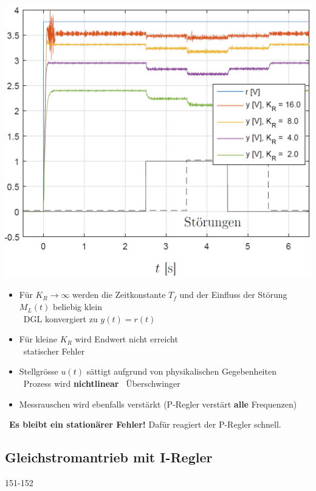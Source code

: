 \begin{minipage}[c]{0.4\columnwidth}
    \includegraphics[width=\columnwidth]{images/gleichstromantrieb_p-regler_step-response.png}
\end{minipage}
\hfill
\begin{minipage}[c]{0.58\columnwidth}
    \begin{itemize}
        \item Für $K_R \to \infty$ werden die Zeitkonstante $T_f$ und der Einfluss der Störung $M_L(t)$ beliebig klein \\
            \textrightarrow\ DGL konvergiert zu $y(t) = r(t)$
        \item Für kleine $K_R$ wird Endwert nicht erreicht \\
            \textrightarrow\ statischer Fehler
        \item Stellgrösse $u(t)$ sättigt aufgrund von physikalischen Gegebenheiten \textrightarrow\ Prozess wird \textbf{nichtlinear}
            \textrightarrow\ Überschwinger
        \item Messrauschen wird ebenfalls verstärkt (P-Regler verstärt \textbf{alle} Frequenzen) 
    \end{itemize}
\end{minipage}

\textrightarrow\ \textbf{Es bleibt ein stationärer Fehler!} Dafür reagiert der P-Regler schnell.


\subsection{Gleichstromantrieb mit I-Regler}{151-152}

